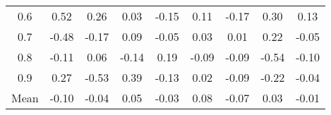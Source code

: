 \documentclass[11pt,a4paper]{report}
\begin{document}
\begin{longtable}{ | c || c | c | c | c | c | c | c || c |}
0.6 &  \cellcolor[HTML]{EFEFFF} 0.52 &  \cellcolor[HTML]{F7F7FF} 0.26 &  \cellcolor[HTML]{FFFFFF} 0.03 &  \cellcolor[HTML]{FFFFFF} -0.15 &  \cellcolor[HTML]{FFFFFF} 0.11 &  \cellcolor[HTML]{FFF7F7} -0.17 &  \cellcolor[HTML]{F7F7FF} 0.30 &  \cellcolor[HTML]{FFFFFF} 0.13 \\
0.7 &  \cellcolor[HTML]{FFF7F7} -0.48 &  \cellcolor[HTML]{FFF7F7} -0.17 &  \cellcolor[HTML]{FFFFFF} 0.09 &  \cellcolor[HTML]{FFFFFF} -0.05 &  \cellcolor[HTML]{FFFFFF} 0.03 &  \cellcolor[HTML]{FFFFFF} 0.01 &  \cellcolor[HTML]{F7F7FF} 0.22 &  \cellcolor[HTML]{FFFFFF} -0.05 \\
0.8 &  \cellcolor[HTML]{FFFFFF} -0.11 &  \cellcolor[HTML]{FFFFFF} 0.06 &  \cellcolor[HTML]{FFFFFF} -0.14 &  \cellcolor[HTML]{F7F7FF} 0.19 &  \cellcolor[HTML]{FFFFFF} -0.09 &  \cellcolor[HTML]{FFFFFF} -0.09 &  \cellcolor[HTML]{FFEFEF} -0.54 &  \cellcolor[HTML]{FFFFFF} -0.10 \\
0.9 &  \cellcolor[HTML]{F7F7FF} 0.27 &  \cellcolor[HTML]{FFEFEF} -0.53 &  \cellcolor[HTML]{F7F7FF} 0.39 &  \cellcolor[HTML]{FFFFFF} -0.13 &  \cellcolor[HTML]{FFFFFF} 0.02 &  \cellcolor[HTML]{FFFFFF} -0.09 &  \cellcolor[HTML]{FFF7F7} -0.22 &  \cellcolor[HTML]{FFFFFF} -0.04 \\
\hline
\hline
Mean  &  \cellcolor[HTML]{FFFFFF} -0.10 &  \cellcolor[HTML]{FFFFFF} -0.04 &  \cellcolor[HTML]{FFFFFF} 0.05 &  \cellcolor[HTML]{FFFFFF} -0.03 &  \cellcolor[HTML]{FFFFFF} 0.08 &  \cellcolor[HTML]{FFFFFF} -0.07 &  \cellcolor[HTML]{FFFFFF} 0.03 &  \cellcolor[HTML]{FFFFFF} -0.01 \\
\hline
\end{longtable}
\end{document}
